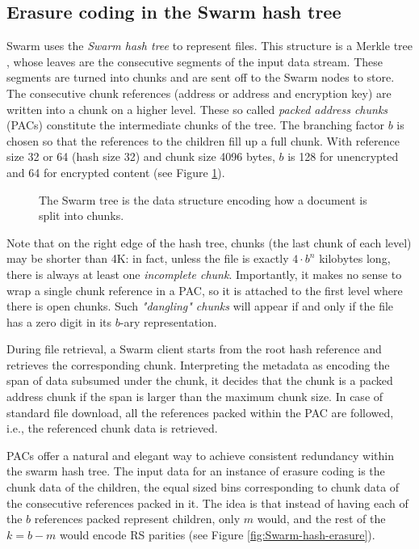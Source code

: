 \subsection{Erasure coding in the Swarm hash tree \statusgreen}
\label{sec:erasure-bmt}

Swarm uses the \emph{Swarm hash tree} to represent files. This structure is a Merkle tree \cite{merkle1980protocols}, whose leaves are the consecutive segments of the input data stream. These segments are turned into chunks and are sent off to the Swarm nodes to store. The consecutive chunk references (address or address and encryption key) are written into a chunk on a higher level.
These so called \emph{packed address chunks} (PACs) constitute the intermediate chunks of the tree.
The branching factor $b$ is chosen so that the references to the children fill up a full chunk.
With reference size 32 or 64 (hash size 32) and chunk size 4096 bytes, $b$ is 128 for unencrypted and 64 for encrypted content 
(see Figure \ref{fig:Swarm-hash-split}).


\begin{figure}[!ht]
   \centering
   
   \caption[Swarm hash split \statusgreen]{The Swarm tree is the data structure encoding how a document is split into chunks.}
   \label{fig:Swarm-hash-split}
\end{figure}

Note that on the right edge of the hash tree, chunks (the last chunk of each level) may be shorter than 4K: in fact, unless the file is exactly $4\cdot b^n$ kilobytes long, there is always at least one \emph{incomplete chunk}.  Importantly, it makes no sense to wrap a single chunk reference in a PAC, so it is attached to the first level where there is open chunks. Such \emph{"dangling" chunks} will appear if and only if the file has a zero digit in its $b$-ary representation. 

During file retrieval, a Swarm client starts from the root hash reference and retrieves the corresponding chunk. Interpreting the metadata as encoding the span of data subsumed under the chunk, it decides that the chunk is a packed address chunk if the span is larger than the maximum chunk size. 
In case of standard file download, all the references packed within the PAC are followed, i.e., the referenced chunk data is retrieved. 

PACs offer a natural and elegant way to achieve consistent redundancy within the swarm hash tree.
The input data for an instance of erasure coding is the chunk data of the children, the equal sized bins corresponding to chunk data of the consecutive references packed in it. The idea is that instead of having each of the $b$ references packed represent children, only $m$ would, and the rest of the $k=b-m$ would encode RS parities (see Figure \ref{fig:Swarm-hash-erasure}).


